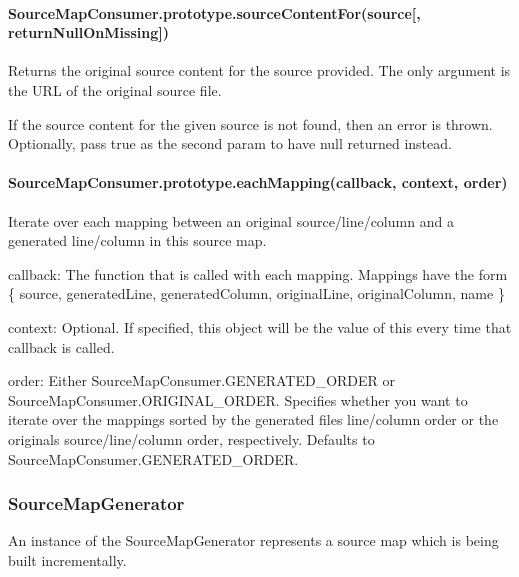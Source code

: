 \paragraph*{Source\+Map\+Consumer.\+prototype.\+source\+Content\+For(source\mbox{[}, return\+Null\+On\+Missing\mbox{]})}

Returns the original source content for the source provided. The only argument is the U\+R\+L of the original source file.

If the source content for the given source is not found, then an error is thrown. Optionally, pass {\ttfamily true} as the second param to have {\ttfamily null} returned instead.

\paragraph*{Source\+Map\+Consumer.\+prototype.\+each\+Mapping(callback, context, order)}

Iterate over each mapping between an original source/line/column and a generated line/column in this source map.


\begin{DoxyItemize}
\item {\ttfamily callback}\+: The function that is called with each mapping. Mappings have the form {\ttfamily \{ source, generated\+Line, generated\+Column, original\+Line, original\+Column, name \}}
\item {\ttfamily context}\+: Optional. If specified, this object will be the value of {\ttfamily this} every time that {\ttfamily callback} is called.
\item {\ttfamily order}\+: Either {\ttfamily Source\+Map\+Consumer.\+G\+E\+N\+E\+R\+A\+T\+E\+D\+\_\+\+O\+R\+D\+E\+R} or {\ttfamily Source\+Map\+Consumer.\+O\+R\+I\+G\+I\+N\+A\+L\+\_\+\+O\+R\+D\+E\+R}. Specifies whether you want to iterate over the mappings sorted by the generated file\textquotesingle{}s line/column order or the original\textquotesingle{}s source/line/column order, respectively. Defaults to {\ttfamily Source\+Map\+Consumer.\+G\+E\+N\+E\+R\+A\+T\+E\+D\+\_\+\+O\+R\+D\+E\+R}.
\end{DoxyItemize}

\subsubsection*{Source\+Map\+Generator}

An instance of the Source\+Map\+Generator represents a source map which is being built incrementally.

